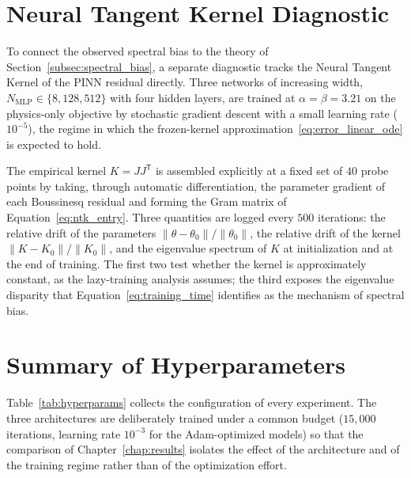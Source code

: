 \section{Neural Tangent Kernel Diagnostic}
\label{sec:met_ntk}

To connect the observed spectral bias to the theory of Section~\ref{subsec:spectral_bias}, a separate diagnostic tracks the Neural Tangent Kernel of the PINN residual directly. Three networks of increasing width, $N_{\mathrm{MLP}} \in \{8, 128, 512\}$ with four hidden layers, are trained at $\alpha = \beta = 3.21$ on the physics-only objective by stochastic gradient descent with a small learning rate ($10^{-5}$), the regime in which the frozen-kernel approximation~\eqref{eq:error_linear_ode} is expected to hold.

The empirical kernel $K = J J^{\mathsf{T}}$ is assembled explicitly at a fixed set of $40$ probe points by taking, through automatic differentiation, the parameter gradient of each Boussinesq residual and forming the Gram matrix of Equation~\eqref{eq:ntk_entry}. Three quantities are logged every $500$ iterations: the relative drift of the parameters $\|\theta - \theta_0\| / \|\theta_0\|$, the relative drift of the kernel $\|K - K_0\| / \|K_0\|$, and the eigenvalue spectrum of $K$ at initialization and at the end of training. The first two test whether the kernel is approximately constant, as the lazy-training analysis assumes; the third exposes the eigenvalue disparity that Equation~\eqref{eq:training_time} identifies as the mechanism of spectral bias.

\section{Summary of Hyperparameters}
\label{sec:met_summary}

Table~\ref{tab:hyperparams} collects the configuration of every experiment. The three architectures are deliberately trained under a common budget ($15{,}000$ iterations, learning rate $10^{-3}$ for the Adam-optimized models) so that the comparison of Chapter~\ref{chap:results} isolates the effect of the architecture and of the training regime rather than of the optimization effort.

